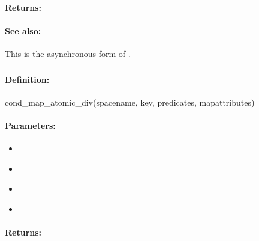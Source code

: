\paragraph{Returns:}


\paragraph{See also:}  This is the asynchronous form of .

\pagebreak
\subsubsection{}
\label{api:ruby:cond_map_atomic_div}


\paragraph{Definition:}
\begin{rubycode}
cond_map_atomic_div(spacename, key, predicates, mapattributes)
\end{rubycode}

\paragraph{Parameters:}
\begin{itemize}[noitemsep]
\item {}\\

\item {}\\

\item {}\\

\item {}\\

\end{itemize}

\paragraph{Returns:}


